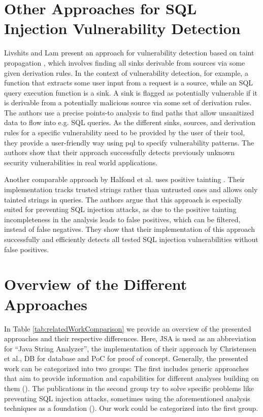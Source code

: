 \section{Other Approaches for SQL Injection Vulnerability Detection}\label{sec:related:otherSQL}

Livshits and Lam present an approach for vulnerability detection based on taint propagation \cite{livshits2005}, which involves finding all sinks derivable from sources via some given derivation rules. In the context of vulnerability detection, for example, a function that extracts some user input from a request is a source, while an SQL query execution function is a sink. A sink is flagged as potentially vulnerable if it is derivable from a potentially malicious source via some set of derivation rules. The authors use a precise points-to analysis to find paths that allow unsanitized data to flow into e.g. SQL queries.
As the different sinks, sources, and derivation rules for a specific vulnerability need to be provided by the user of their tool, they provide a user-friendly way using \ac{pql} to specify vulnerability patterns. 
The authors show that their approach successfully detects previously unknown security vulnerabilities in real world applications.

Another comparable approach by Halfond et al. uses positive tainting \cite{wasp}. Their implementation tracks trusted strings rather than untrusted ones and allows only tainted strings in queries. The authors argue that this approach is especially suited for preventing SQL injection attacks, as due to the positive tainting incompleteness in the analysis leads to false positives, which can be filtered, instead of false negatives. They show that their implementation of this approach successfully and efficiently detects all tested SQL injection vulnerabilities without false positives.

\section{Overview of the Different Approaches}

In Table \ref{tab:relatedWorkComparison} we provide an overview of the presented approaches and their respective differences. Here, JSA is used as an abbreviation for \enquote{Java String Analyzer}, the implementation of their approach by Christensen et al., DB for database and PoC for proof of concept. Generally, the presented work can be categorized into two groups: The first includes generic approaches that aim to provide information and capabilities for different analyses building on them (\cite{brics,banshee,regex_types}). The publications in the second group try to solve specific problems like preventing SQL injection attacks, sometimes using the aforementioned analysis techniques as a foundation (\cite{gould2004static,amnesia,wasp,xduce,xact,livshits2005,sqli_wassermann_su}). Our work could be categorized into the first group.

